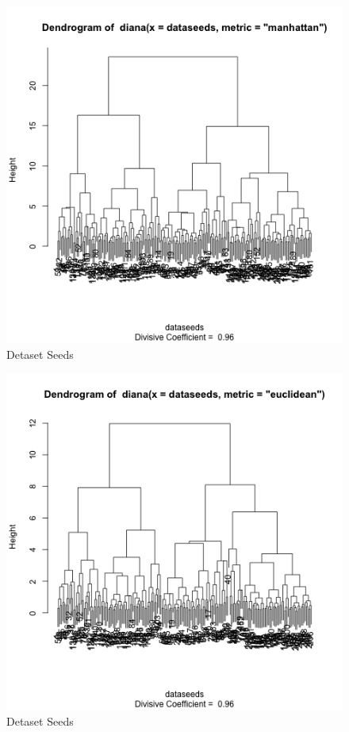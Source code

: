 \documentclass{article}
\begin{document}
\begin{figure}[ht!]
\caption{Detaset Seeds}
\centering
\includegraphics[width=1\textwidth]{plots/dv1dataseeds.png}
\end{figure}

\begin{figure}[ht!]
\caption{Detaset Seeds}
\centering
\includegraphics[width=1\textwidth]{plots/dv2dataseeds.png}
\end{figure}
\end{document}
